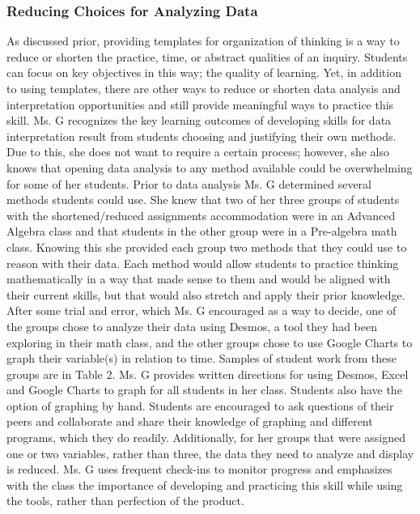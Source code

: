 \documentclass[11pt]{sig-alternate}
\begin{document}
\begin{large}
\subsubsection*{Reducing Choices for Analyzing Data}
As discussed prior, providing templates for organization of thinking is a way to reduce or shorten the practice, time, or abstract qualities of an inquiry. Students can focus on key objectives in this way; the quality of learning. Yet, in addition to using templates, there are other ways to reduce or shorten data analysis and interpretation opportunities and still provide meaningful ways to practice this skill. Ms. G recognizes the key learning outcomes of developing skills for data interpretation result from students choosing and justifying their own methods. Due to this, she does not want to require a certain process; however, she also knows that opening data analysis to any method available could be overwhelming for some of her students. Prior to data analysis Ms. G determined several methods students could use. She knew that two of her three groups of students with the shortened/reduced assignments accommodation were in an Advanced Algebra class and that students in the other group were in a Pre-algebra math class. Knowing this she provided each group two methods that they could use to reason with their data. Each method would allow students to practice thinking mathematically in a way that made sense to them and would be aligned with their current skills, but that would also stretch and apply their prior knowledge. After some trial and error, which Ms. G encouraged as a way to decide, one of the groups chose to analyze their data using Desmos, a tool they had been exploring in their math class, and the other groups chose to use Google Charts to graph their variable(s) in relation to time. Samples of student work from these groups are in Table 2. Ms. G provides written directions for using Desmos, Excel and Google Charts to graph for all students in her class. Students also have the option of graphing by hand. Students are encouraged to ask questions of their peers and collaborate and share their knowledge of graphing and different programs, which they do readily. Additionally, for her groups that were assigned one or two variables, rather than three, the data they need to analyze and display is reduced. Ms. G uses frequent check-ins to monitor progress and emphasizes with the class the importance of developing and practicing this skill while using the tools, rather than perfection of the product.


\end{large}
\end{document}
